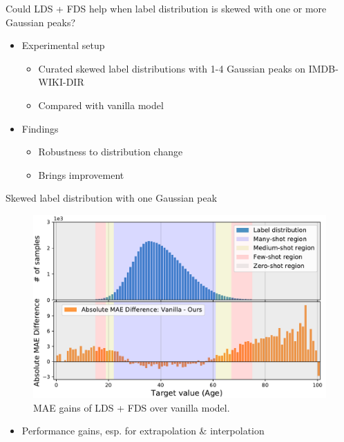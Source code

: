 
\begin{frame}{Could LDS + FDS help when label distribution is skewed with one or more Gaussian peaks?}
	\begin{itemize}\setlength\itemsep{1.5em}
		\item Experimental setup
		\begin{itemize}
			\item Curated skewed label distributions with 1-4 Gaussian peaks on IMDB-WIKI-DIR
			\item Compared with vanilla model
		\end{itemize}
		\item Findings
		\begin{itemize}
			\item Robustness to distribution change
			\item Brings improvement
		\end{itemize}
	\end{itemize}
\end{frame}

\begin{frame}{Skewed label distribution with one Gaussian peak}
	\begin{figure}[h]
		\includegraphics[width=0.7\linewidth]{images/interp_extrap_diff_peak1.pdf}
		\caption{MAE gains of LDS + FDS over vanilla model.}
	\end{figure}
	\begin{itemize}
		\item Performance gains, esp. for extrapolation \& interpolation
	\end{itemize}
\end{frame}

